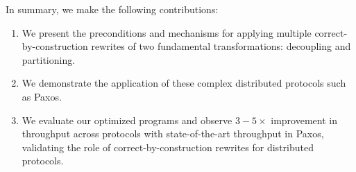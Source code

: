 In summary, we make the following contributions:
\begin{enumerate}
    \item We present the preconditions and mechanisms for applying multiple correct-by-construction rewrites of two fundamental transformations: decoupling and partitioning.
    \item We demonstrate the application of these  complex distributed protocols such as Paxos.
    \item We evaluate our optimized programs and observe $3-5\times$ improvement in throughput across protocols with state-of-the-art throughput in Paxos,
    validating the role of correct-by-construction rewrites for distributed protocols.
\end{enumerate}

